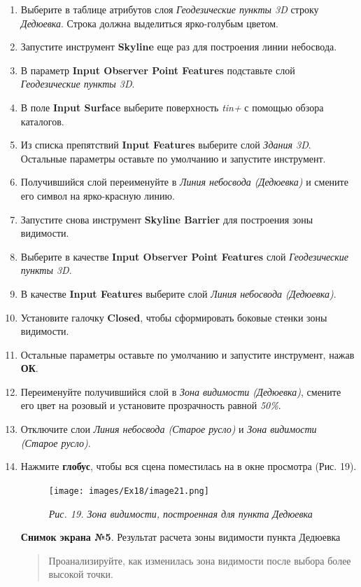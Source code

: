 \documentclass[12pt,]{book}
\begin{document}
\begin{enumerate}
\def\labelenumi{\arabic{enumi}.}
\item
  Выберите в таблице атрибутов слоя \emph{Геодезические пункты 3D} строку \emph{Дедюевка}. Строка должна выделиться ярко-голубым цветом.
\item
  Запустите инструмент \textbf{Skyline} еще раз для построения линии небосвода.
\item
  В параметр \textbf{Input Observer Point Features} подставьте слой \emph{Геодезические пункты 3D}.
\item
  В поле \textbf{Input Surface} выберите поверхность \emph{tin+} с помощью обзора каталогов.
\item
  Из списка препятствий \textbf{Input Features} выберите слой \emph{Здания 3D}. Остальные параметры оставьте по умолчанию и запустите инструмент.
\item
  Получившийся слой переименуйте в \emph{Линия небосвода (Дедюевка)} и смените его символ на ярко-красную линию.
\item
  Запустите снова инструмент \textbf{Skyline Barrier} для построения зоны видимости.
\item
  Выберите в качестве \textbf{Input Observer Point Features} слой \emph{Геодезические пункты 3D}.
\item
  В качестве \textbf{Input Features} выберите слой \emph{Линия небосвода (Дедюевка)}.
\item
  Установите галочку \textbf{Closed}, чтобы сформировать боковые стенки зоны видимости.
\item
  Остальные параметры оставьте по умолчанию и запустите инструмент, нажав \textbf{ОК}.
\item
  Переименуйте получившийся слой в \emph{Зона видимости (Дедюевка)}, смените его цвет на розовый и установите прозрачность равной \emph{50\%}.
\item
  Отключите слои \emph{Линия небосвода (Старое русло)} и \emph{Зона видимости (Старое русло)}.
\item
  Нажмите \textbf{глобус}, чтобы вся сцена поместилась на в окне просмотра (Рис. 19).

  \begin{figure}
  \centering
  \texttt{[image: images/Ex18/image21.png]}
  \caption{\emph{Рис. 19. Зона видимости, построенная для пункта Дедюевка}}
  \end{figure}

  \textbf{Снимок экрана №5}. Результат расчета зоны видимости пункта Дедюевка

  \begin{quote}
  Проанализируйте, как изменилась зона видимости после выбора более высокой точки.
  \end{quote}
\end{enumerate}
\end{document}
